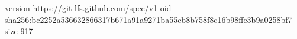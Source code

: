 version https://git-lfs.github.com/spec/v1
oid sha256:bc2252a536632866317b671a91a9271ba55cb8b758f8c16b98ffe3b9a0258bf7
size 917
